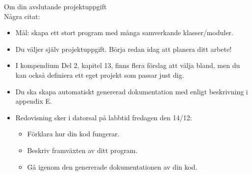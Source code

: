 




\begin{Slide}{Om din avslutande projektuppgift}\SlideFontSmall
{} \\
Några citat:
\begin{itemize}
\item Mål: skapa ett stort program med många samverkande klasser/moduler.
\item Du väljer själv projektuppgift. Börja redan idag att planera ditt arbete!

\item I kompendium Del 2, kapitel 13, finns flera förslag att välja bland, men du kan också definiera ett eget projekt som passar just dig.


\item Du ska skapa automatiskt genererad dokumentation med  enligt beskrivning i appendix E.

\item Redovisning sker i datorsal på labbtid fredagen den 14/12:
\begin{itemize}\SlideFontTiny
  \item Förklara hur din kod fungerar.
  \item Beskriv framväxten av ditt program.
  \item Gå igenom den genererade dokumentationen av din kod.
\end{itemize}
\end{itemize}

\end{Slide}

